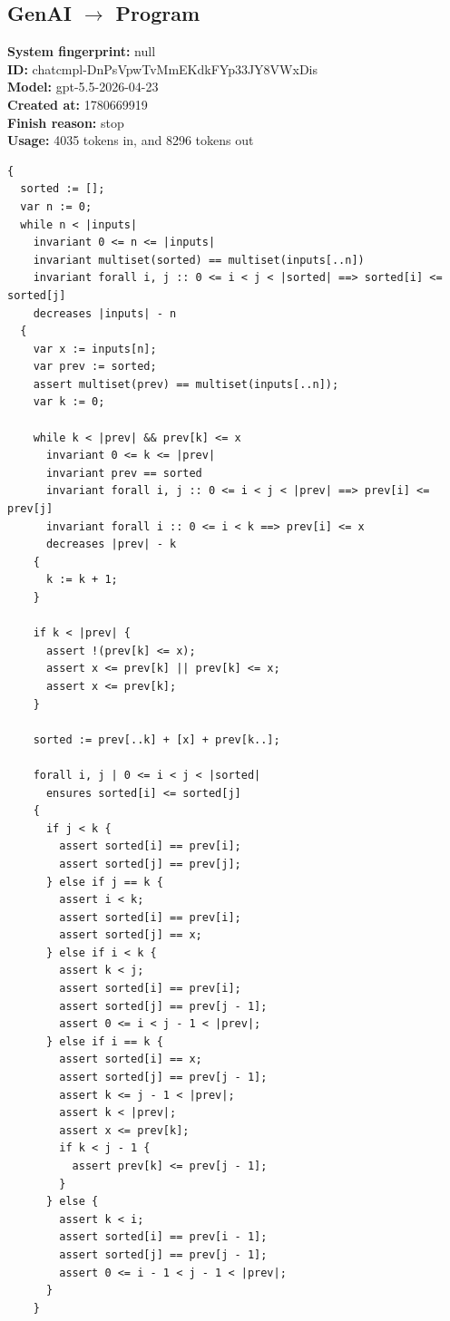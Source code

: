 \documentclass{article}
\begin{document}
\subsection*{GenAI $\rightarrow$ Program}
\textbf{System fingerprint: }null
\\\textbf{ID: }chatcmpl-DnPsVpwTvMmEKdkFYp33JY8VWxDis
\\\textbf{Model: }gpt-5.5-2026-04-23
\\\textbf{Created at: }1780669919
\\\textbf{Finish reason: }stop
\\\textbf{Usage: }4035 tokens in, and 8296 tokens out
\begin{lstlisting}
{
  sorted := [];
  var n := 0;
  while n < |inputs|
    invariant 0 <= n <= |inputs|
    invariant multiset(sorted) == multiset(inputs[..n])
    invariant forall i, j :: 0 <= i < j < |sorted| ==> sorted[i] <= sorted[j]
    decreases |inputs| - n
  {
    var x := inputs[n];
    var prev := sorted;
    assert multiset(prev) == multiset(inputs[..n]);
    var k := 0;

    while k < |prev| && prev[k] <= x
      invariant 0 <= k <= |prev|
      invariant prev == sorted
      invariant forall i, j :: 0 <= i < j < |prev| ==> prev[i] <= prev[j]
      invariant forall i :: 0 <= i < k ==> prev[i] <= x
      decreases |prev| - k
    {
      k := k + 1;
    }

    if k < |prev| {
      assert !(prev[k] <= x);
      assert x <= prev[k] || prev[k] <= x;
      assert x <= prev[k];
    }

    sorted := prev[..k] + [x] + prev[k..];

    forall i, j | 0 <= i < j < |sorted|
      ensures sorted[i] <= sorted[j]
    {
      if j < k {
        assert sorted[i] == prev[i];
        assert sorted[j] == prev[j];
      } else if j == k {
        assert i < k;
        assert sorted[i] == prev[i];
        assert sorted[j] == x;
      } else if i < k {
        assert k < j;
        assert sorted[i] == prev[i];
        assert sorted[j] == prev[j - 1];
        assert 0 <= i < j - 1 < |prev|;
      } else if i == k {
        assert sorted[i] == x;
        assert sorted[j] == prev[j - 1];
        assert k <= j - 1 < |prev|;
        assert k < |prev|;
        assert x <= prev[k];
        if k < j - 1 {
          assert prev[k] <= prev[j - 1];
        }
      } else {
        assert k < i;
        assert sorted[i] == prev[i - 1];
        assert sorted[j] == prev[j - 1];
        assert 0 <= i - 1 < j - 1 < |prev|;
      }
    }


\end{lstlisting}
\end{document}
